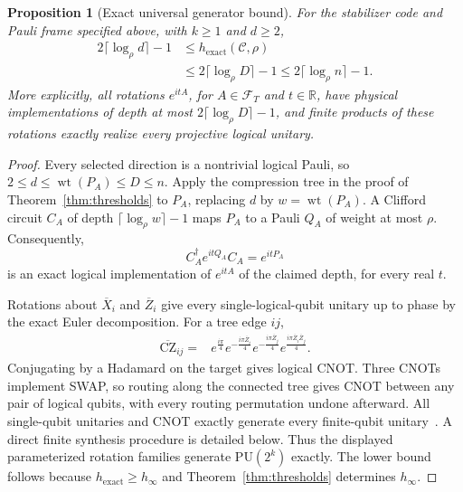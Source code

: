 \documentclass[aps,prl,reprint,notitlepage,nofootinbib,nobibnotes]{revtex4-2}
\newtheorem{proposition}{Proposition}
\newcommand{\PU}{\mathrm{PU}}
\begin{document}
\begin{proposition}[Exact universal generator bound]\label{prop:exact-upper}
For the stabilizer code  and Pauli frame specified above, with $k\ge1$ and $d\ge2$,
\begin{align}
 2\lceil\log_\rho d\rceil-1
 &\le h_{\mathrm{exact}}(\mathcal C,\rho)\nonumber\\
 &\le 2\lceil\log_\rho D\rceil-1
 \le 2\lceil\log_\rho n\rceil-1.
 \label{eq:exact-upper}
\end{align}
More explicitly, all rotations $e^{itA}$, for $A\in\mathcal F_T$ and $t\in\mathbb R$, have physical
implementations of depth at most $2\lceil\log_\rho D\rceil-1$, and finite products of these
rotations exactly realize every projective logical unitary.
\end{proposition}

\begin{proof}
Every selected direction is a nontrivial logical Pauli, so $2\le d\le\operatorname{wt}(P_A)\le D\le
n$. Apply the compression tree in the proof of Theorem~\ref{thm:thresholds} to $P_A$, replacing $d$
by $w=\operatorname{wt}(P_A)$. A Clifford circuit $C_A$ of depth $\lceil\log_\rho w\rceil-1$ maps
$P_A$ to a Pauli $Q_A$ of weight at most $\rho$. Consequently,
\[
 C_A^\dagger e^{itQ_A}C_A=e^{itP_A}
\]
is an exact logical implementation of $e^{itA}$ of the claimed depth, for every real $t$.

Rotations about $\overline X_i$ and $\overline Z_i$ give every single-logical-qubit unitary up to
phase by the exact Euler decomposition. For a tree edge $ij$,
\begin{align}
 \overline{\mathrm{CZ}}_{ij}
 ={}&e^{\frac{i\pi}{4}}
 e^{-\frac{i\pi\overline Z_i}{4}}
 e^{-\frac{i\pi\overline Z_j}{4}}
 e^{\frac{i\pi\overline Z_i\overline Z_j}{4}}.
 \label{eq:exact-cz}
\end{align}
Conjugating by a Hadamard on the target gives logical CNOT. Three CNOTs implement SWAP, so routing
along the connected tree gives CNOT between any pair of logical qubits, with every routing
permutation undone afterward. All single-qubit unitaries and CNOT exactly generate every
finite-qubit unitary~\cite{Barenco,Shende}. A direct finite synthesis procedure is detailed below.
Thus the displayed parameterized rotation families generate $\PU(2^k)$ exactly. The lower bound
follows because $h_{\mathrm{exact}}\ge h_\infty$ and Theorem~\ref{thm:thresholds} determines
$h_\infty$.
\end{proof}
\end{document}
